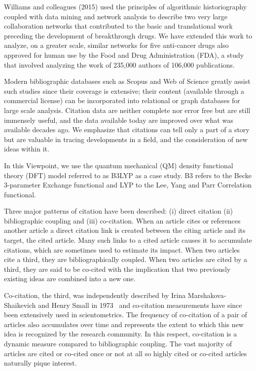 \documentclass[journal=jcdis8,manuscript=article]{achemso}
\begin{document}
Williams and colleagues (2015)\citep{williams2015scientific} used the principles of algorithmic historiography coupled with data mining and network analysis to describe two very large collaboration networks that contributed to the basic and translational work preceding the development of breakthrough drugs. We have extended this work to analyze, on a greater scale, similar networks for five anti-cancer drugs also approved for human use by the Food and Drug Administration (FDA), a study that involved analyzing the work of 235,000 authors of 106,000 publications. 

Modern bibliographic databases such as Scopus and Web of Science greatly assist such studies since their coverage is extensive; their content (available through a commercial license) can be incorporated into relational or graph databases for large scale analysis. Citation data are neither complete nor error free but are still immensely useful, and the data available today are improved over what was available decades ago. We emphasize that citations can tell only a part of a story but are valuable in tracing developments in a field, and the consideration of new ideas within it.  

In this Viewpoint, we use the quantum mechanical (QM) density functional theory (DFT) model referred to as B3LYP as a case study. B3 refers to the Becke 3-parameter Exchange functional and LYP to the Lee, Yang and Parr Correlation functional.

Three major patterns of citation have been described: (i) direct citation (ii) bibliographic coupling and (iii) co-citation. When an article cites or references another article a direct citation link is created between the citing article and its target, the cited article. Many such links to a cited article causes it to accumulate citations, which are sometimes used to estimate its impact. When two articles cite a third, they are bibliographically coupled. When two articles are cited by a third, they are said to be co-cited with the implication that two previously existing ideas are combined into a new one. 

Co-citation, the third, was independently described by Irina Marshakova-Shaikevich and Henry Small in 1973~\citep{MarshakovaShaikevich1973,Small1973} and co-citation measurements have since been extensively used in scientometrics. The frequency of co-citation of a pair of articles  also accumulates over time and represents the extent to which this new idea is recognized by the research community. In this respect, co-citation is a dynamic measure compared to bibliographic coupling. The vast majority of articles are cited or co-cited once or not at all so highly cited or co-cited articles naturally pique interest. 
\end{document}
